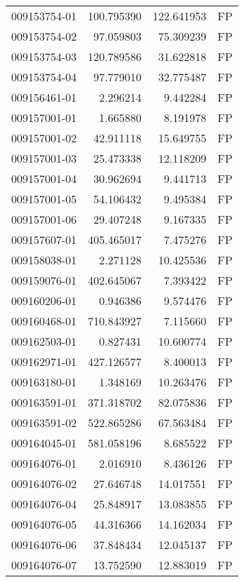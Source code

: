 \begin{tabular}{lrrl}
009153754-01 &  100.795390 &     122.641953 &   FP \\
009153754-02 &   97.059803 &      75.309239 &   FP \\
009153754-03 &  120.789586 &      31.622818 &   FP \\
009153754-04 &   97.779010 &      32.775487 &   FP \\
009156461-01 &    2.296214 &       9.442284 &   FP \\
009157001-01 &    1.665880 &       8.191978 &   FP \\
009157001-02 &   42.911118 &      15.649755 &   FP \\
009157001-03 &   25.473338 &      12.118209 &   FP \\
009157001-04 &   30.962694 &       9.441713 &   FP \\
009157001-05 &   54.106432 &       9.495384 &   FP \\
009157001-06 &   29.407248 &       9.167335 &   FP \\
009157607-01 &  405.465017 &       7.475276 &   FP \\
009158038-01 &    2.271128 &      10.425536 &   FP \\
009159076-01 &  402.645067 &       7.393422 &   FP \\
009160206-01 &    0.946386 &       9.574476 &   FP \\
009160468-01 &  710.843927 &       7.115660 &   FP \\
009162503-01 &    0.827431 &      10.600774 &   FP \\
009162971-01 &  427.126577 &       8.400013 &   FP \\
009163180-01 &    1.348169 &      10.263476 &   FP \\
009163591-01 &  371.318702 &      82.075836 &   FP \\
009163591-02 &  522.865286 &      67.563484 &   FP \\
009164045-01 &  581.058196 &       8.685522 &   FP \\
009164076-01 &    2.016910 &       8.436126 &   FP \\
009164076-02 &   27.646748 &      14.017551 &   FP \\
009164076-04 &   25.848917 &      13.083855 &   FP \\
009164076-05 &   44.316366 &      14.162034 &   FP \\
009164076-06 &   37.848434 &      12.045137 &   FP \\
009164076-07 &   13.752590 &      12.883019 &   FP \\

\end{tabular}
